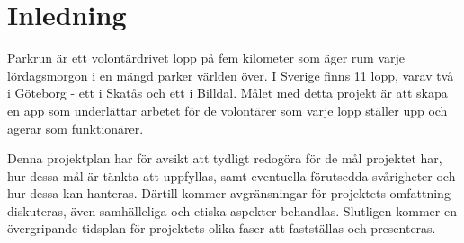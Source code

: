 \section{Inledning} 
Parkrun\cite{omOss} är ett volontärdrivet lopp på fem kilometer som äger rum varje lördagsmorgon i en mängd parker världen över. I Sverige finns 11 lopp, varav två i Göteborg - ett i Skatås och ett i Billdal. Målet med detta projekt är att skapa en app som underlättar arbetet för de volontärer som varje lopp ställer upp och agerar som funktionärer.

Denna projektplan har för avsikt att tydligt redogöra för de mål projektet har, hur dessa mål är tänkta att uppfyllas, samt eventuella förutsedda svårigheter och hur dessa kan hanteras. Därtill kommer avgränsningar för projektets omfattning diskuteras, även samhälleliga och etiska aspekter behandlas. Slutligen kommer en övergripande tidsplan för projektets olika faser att fastställas och presenteras.

